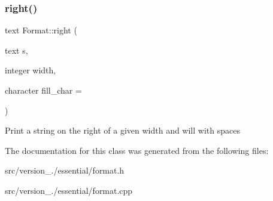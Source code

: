 \subsubsection{\texorpdfstring{right()}{right()}}
{\footnotesize\ttfamily text Format\+::right (\begin{DoxyParamCaption}\item[{text}]{s,  }\item[{integer}]{width,  }\item[{character}]{fill\+\_\+char = {\ttfamily \textquotesingle{}~\textquotesingle{}} }\end{DoxyParamCaption})\hspace{0.3cm}{\ttfamily [static]}}

Print a string on the right of a given width and will with spaces 

The documentation for this class was generated from the following files\+:\begin{DoxyCompactItemize}
\item 
src/version\+\_./essential/format.\+h\item 
src/version\+\_./essential/format.\+cpp\end{DoxyCompactItemize}
